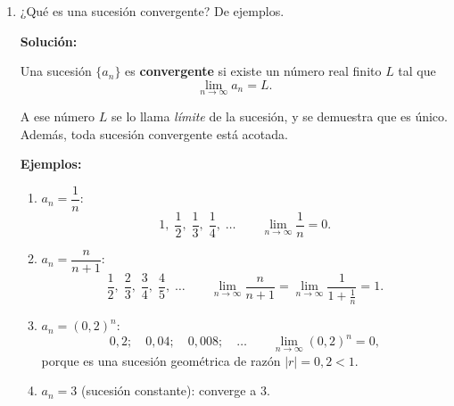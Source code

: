 \documentclass[12pt]{article}
\newcommand{\solucion}{%
    \vspace{0.8em}%
    \textbf{Solución:}%
}
\begin{document}
\begin{enumerate}[label=\alph*.-]
    \solucion

    Significa que la sucesión \textbf{crece sin cota}. Formalmente:
    \[
    \lim_{n\to\infty}a_n=\infty
    \quad\Longleftrightarrow\quad
    \forall\,M>0\;\;\exists\,N\in\mathbb{N}
    \;\;\text{tal que}\;\;
    n>N\;\Longrightarrow\;a_n>M .
    \]

    O sea: fijada cualquier cota $M$, por grande que sea, a partir de cierto
    índice todos los términos la superan.

    Es importante notar que $\infty$ \textbf{no es un número real}, por lo que en
    este caso la sucesión \emph{no converge}: se dice que \textbf{diverge a
    infinito}. La notación $\lim a_n=\infty$ sólo describe la forma en que la
    sucesión deja de estar acotada, no un valor al que la sucesión se aproxime.

    Por ejemplo, $a_n=n^2$ cumple $\lim\limits_{n\to\infty}n^2=\infty$.

    \item ¿Qué es una sucesión convergente? De ejemplos.

    \solucion

    Una sucesión $\{a_n\}$ es \textbf{convergente} si existe un número real
    finito $L$ tal que
    \[
    \lim_{n\to\infty}a_n=L .
    \]

    A ese número $L$ se lo llama \emph{límite} de la sucesión, y se demuestra que
    es único. Además, toda sucesión convergente está acotada.

    \textbf{Ejemplos:}

    \begin{enumerate}[label=\roman*.-]

        \item $a_n=\dfrac{1}{n}$:
        \[
        1,\;\frac12,\;\frac13,\;\frac14,\;\dots
        \qquad
        \lim_{n\to\infty}\frac1n=0 .
        \]

        \item $a_n=\dfrac{n}{n+1}$:
        \[
        \frac12,\;\frac23,\;\frac34,\;\frac45,\;\dots
        \qquad
        \lim_{n\to\infty}\frac{n}{n+1}
        =\lim_{n\to\infty}\frac{1}{1+\frac1n}=1 .
        \]

        \item $a_n=(0{,}2)^n$:
        \[
        0{,}2;\quad 0{,}04;\quad 0{,}008;\quad\dots
        \qquad
        \lim_{n\to\infty}(0{,}2)^n=0,
        \]
        porque es una sucesión geométrica de razón $|r|=0{,}2<1$.

        \item $a_n=3$ (sucesión constante): converge a $3$.


\end{enumerate}
\end{enumerate}
\end{document}
